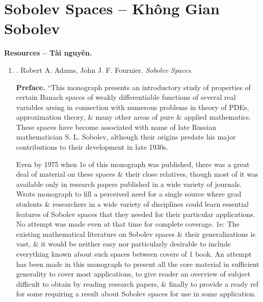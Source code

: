 \documentclass{article}
\begin{document}

\section{Sobolev Spaces -- Không Gian Sobolev}
\textbf{\textsf{Resources -- Tài nguyên.}}
\begin{enumerate}
	\item \cite{Adams_Fournier2003}. {\sc Robert A. Adams, John J. F. Fournier}. {\it Sobolev Spaces}.
	
	{\bf Preface.} ``This monograph presents an introductory study of properties of certain Banach spaces of weakly differentiable functions of several real variables arsing in connection with numerous problems in theory of PDEs, approximation theory, \& many other areas of pure \& applied mathematics. These spaces have become associated with name of late Russian mathematician {\sc S. L. Sobolev}, although their origins predate his major contributions to their development in late 1930s.
	
	Even by 1975 when 1e of this monograph was published, there was a great deal of material on these spaces \& their close relatives, though most of it was available only in research papers published in a wide variety of journals. Wrote monograph to fill a perceived need for a single source where grad students \& researchers in a wide variety of disciplines could learn essential features of Sobolev spaces that they needed for their particular applications. No attempt was made even at that time for complete coverage. 1e: The existing mathematical literature on Sobolev spaces \& their generalizations is vast, \& it would be neither easy nor particularly desirable to include everything known about such spaces between covers of 1 book. An attempt has been made in this monograph to present all the core material in sufficient generality to cover most applications, to give reader an overview of subject difficult to obtain by reading research papers, \& finally to provide a ready ref for some requiring a result about Sobolev spaces for use in some application.
	

\end{enumerate}
\end{document}
